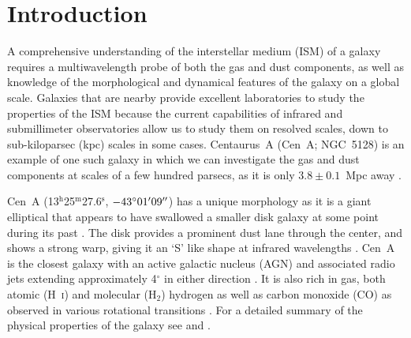 


\section{Introduction}\label{intro4}
A comprehensive understanding of the interstellar medium (ISM) of a galaxy requires a multiwavelength probe of both the gas and dust components, as well as knowledge of the morphological and dynamical features of the galaxy on a global scale.  Galaxies that are nearby provide excellent laboratories to study the properties of the ISM because the current capabilities of infrared and submillimeter observatories allow us to study them on resolved scales, down to sub-kiloparsec (kpc) scales in some cases.  Centaurus~A (Cen~A; NGC~5128) is an example of one such galaxy in which we can investigate the gas and dust components at scales of a few hundred parsecs, as it is only $3.8 \pm 0.1$~Mpc away \citep{2010PASA...27..457H}.

Cen~A (13$^{\mathrm{h}}$25$^{\mathrm{m}}$27.6$^{\mathrm{s}}$, $-43^{\circ}01\mbox{$^\prime$}09\mbox{$^{\prime\prime}$}$) has a unique morphology as it is a giant elliptical that appears to have swallowed a smaller disk galaxy at some point during its past \citep[e.g. ][]{1980ApJ...241..969T}.  The disk provides a prominent dust lane through the center, and shows a strong warp, giving it an `S' like shape at infrared wavelengths \citep{2002ApJ...565..131L, 2006ApJ...645.1092Q, 2008A&A...490...77W, 2012MNRAS.422.2291P}.  Cen~A is the closest galaxy with an active galactic nucleus (AGN) and associated radio jets extending approximately 4$^{\circ}$ in either direction \citep[e.g.][]{1997A&AS..121...11C, 1998A&ARv...8..237I}.  It is also rich in gas, both atomic (H~\textsc{i}) and molecular (H$_{2}$) hydrogen \citep{2008A&A...485L...5M,2010A&A...515A..67S} as well as carbon monoxide (CO) as observed in various rotational transitions \citep{1987ApJ...322L..73P,1990ApJ...363..451E,1992ApJ...391..121Q,1993A&A...270L..13R, 2012MNRAS.422.2291P}.  For a detailed summary of the physical properties of the galaxy see \citet{1998A&ARv...8..237I} and \citet{2010PASA...27..463M}.

